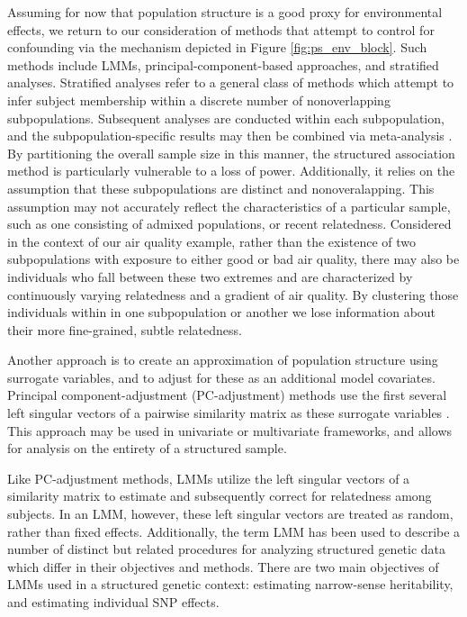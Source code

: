 Assuming for now that population structure is a good proxy for environmental effects, we return to our consideration of methods that attempt to control for confounding via the mechanism depicted in Figure \ref{fig:ps_env_block}. Such methods include LMMs, principal-component-based approaches, and stratified analyses. Stratified analyses refer to a general class of methods which attempt to infer subject membership within a discrete number of nonoverlapping subpopulations. Subsequent analyses are conducted within each subpopulation, and the subpopulation-specific results may then be combined via meta-analysis \citep{pritchard1999use, pritchard2000association}. By partitioning the overall sample size in this manner, the structured association method is particularly vulnerable to a loss of power. Additionally, it relies on the assumption that these subpopulations are distinct and nonoveralapping. This assumption may not accurately reflect the characteristics of a particular sample, such as one consisting of admixed populations, or recent relatedness. Considered in the context of our air quality example, rather than the existence of two subpopulations with exposure to either good or bad air quality, there may also be individuals who fall between these two extremes and are characterized by continuously varying relatedness and a gradient of air quality. By clustering those individuals within in one subpopulation or another we lose information about their more fine-grained, subtle relatedness.

Another approach is to create an approximation of population structure using surrogate variables, and to adjust for these as an additional model covariates. Principal component-adjustment (PC-adjustment) methods use the first several left singular vectors of a pairwise similarity matrix as these surrogate variables \citep{price2006principal}. This approach may be used in univariate or multivariate frameworks, and allows for analysis on the entirety of a structured sample. 

Like PC-adjustment methods, LMMs utilize the left singular vectors of a similarity matrix to estimate and subsequently correct for relatedness among subjects. In an LMM, however, these left singular vectors are treated as random, rather than fixed effects. Additionally, the term LMM has been used to describe a number of distinct but related procedures for analyzing structured genetic data which differ in their objectives and methods. There are two main objectives of LMMs used in a structured genetic context: estimating narrow-sense heritability, and estimating individual SNP effects.

